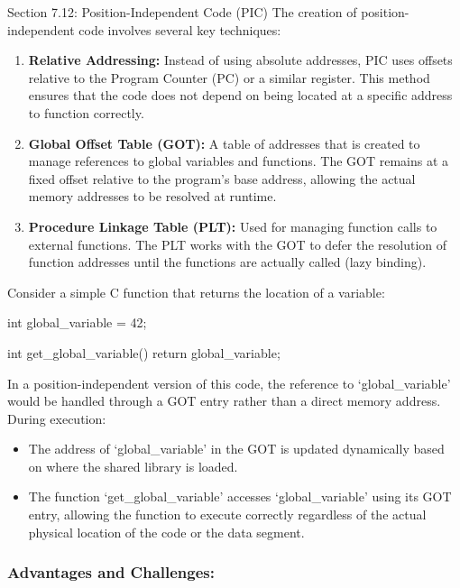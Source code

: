 \begin{notes}{Section 7.12: Position-Independent Code (PIC)}
    The creation of position-independent code involves several key techniques:
    \begin{enumerate}
        \item \textbf{Relative Addressing:} Instead of using absolute addresses, PIC uses offsets relative to the Program Counter (PC) or a similar register. This method ensures that the code does 
        not depend on being located at a specific address to function correctly.
        \item \textbf{Global Offset Table (GOT):} A table of addresses that is created to manage references to global variables and functions. The GOT remains at a fixed offset relative to the program's 
        base address, allowing the actual memory addresses to be resolved at runtime.
        \item \textbf{Procedure Linkage Table (PLT):} Used for managing function calls to external functions. The PLT works with the GOT to defer the resolution of function addresses until the functions 
        are actually called (lazy binding).
    \end{enumerate}
    
    \begin{highlight}
        Consider a simple C function that returns the location of a variable:
    \begin{code}[C]
    int global_variable = 42;

    int get_global_variable() {
        return global_variable;
    }
    \end{code}
        In a position-independent version of this code, the reference to `global\_variable' would be handled through a GOT entry rather than a direct memory address. During execution:
        \begin{itemize}
            \item The address of `global\_variable' in the GOT is updated dynamically based on where the shared library is loaded.
            \item The function `get\_global\_variable' accesses `global\_variable' using its GOT entry, allowing the function to execute correctly regardless of the actual physical location of the code 
            or the data segment.
        \end{itemize}
    \end{highlight}
    
    \subsubsection*{Advantages and Challenges:}
    

\end{notes}
